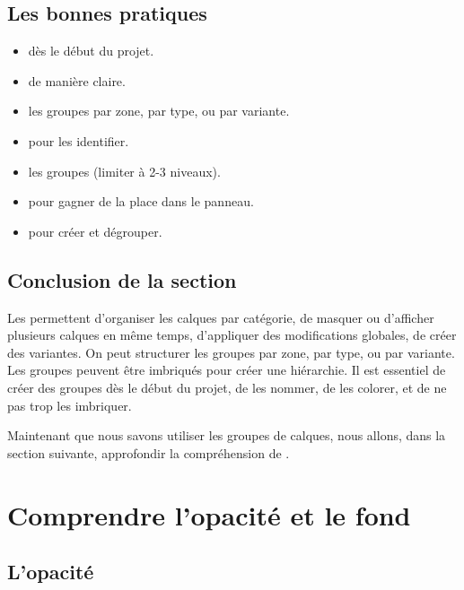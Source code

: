 \subsection{Les bonnes pratiques}

\begin{itemize}
    \item {} dès le début du projet.
    \item {} de manière claire.
    \item {} les groupes par zone, par type, ou par variante.
    \item {} pour les identifier.
    \item {} les groupes (limiter à 2-3 niveaux).
    \item {} pour gagner de la place dans le panneau.
    \item {} pour créer et dégrouper.
\end{itemize}

\subsection*{Conclusion de la section}

Les  permettent d'organiser les calques par catégorie, de masquer ou d'afficher plusieurs calques en même temps, d'appliquer des modifications globales, de créer des variantes. On peut structurer les groupes par zone, par type, ou par variante. Les groupes peuvent être imbriqués pour créer une hiérarchie. Il est essentiel de créer des groupes dès le début du projet, de les nommer, de les colorer, et de ne pas trop les imbriquer.

Maintenant que nous savons utiliser les groupes de calques, nous allons, dans la section suivante, approfondir la compréhension de .

\section{Comprendre l'opacité et le fond}

\subsection{L'opacité}

